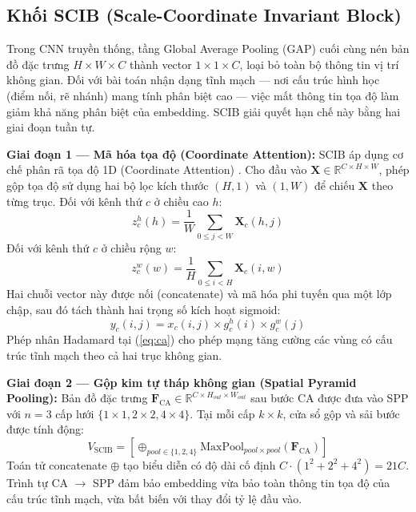 \documentclass[12pt,a4paper]{article}
\begin{document}
\subsection{Khối SCIB (Scale-Coordinate Invariant Block)}

Trong CNN truyền thống, tầng Global Average Pooling (GAP) cuối cùng nén bản đồ đặc trưng $H \times W \times C$ thành vector $1 \times 1 \times C$, loại bỏ toàn bộ thông tin vị trí không gian. Đối với bài toán nhận dạng tĩnh mạch --- nơi cấu trúc hình học (điểm nối, rẽ nhánh) mang tính phân biệt cao --- việc mất thông tin tọa độ làm giảm khả năng phân biệt của embedding. SCIB giải quyết hạn chế này bằng hai giai đoạn tuần tự.

\textbf{Giai đoạn 1 --- Mã hóa tọa độ (Coordinate Attention):} SCIB áp dụng cơ chế phân rã tọa độ 1D (Coordinate Attention) \cite{b7}. Cho đầu vào $\mathbf{X} \in \mathbb{R}^{C \times H \times W}$, phép gộp tọa độ sử dụng hai bộ lọc kích thước $(H, 1)$ và $(1, W)$ để chiếu $\mathbf{X}$ theo từng trục.
Đối với kênh thứ $c$ ở chiều cao $h$:
\begin{equation}
z_c^h(h) = \frac{1}{W}\sum_{0 \le j < W} \mathbf{X}_c(h, j)
\end{equation}
Đối với kênh thứ $c$ ở chiều rộng $w$:
\begin{equation}
z_c^w(w) = \frac{1}{H}\sum_{0 \le i < H} \mathbf{X}_c(i, w)
\end{equation}
Hai chuỗi vector này được nối (concatenate) và mã hóa phi tuyến qua một lớp chập, sau đó tách thành hai trọng số kích hoạt sigmoid:
\begin{equation}
y_c(i,j) = x_c(i,j) \times g_c^h(i) \times g_c^w(j)
\label{eq:ca}
\end{equation}
Phép nhân Hadamard tại (\ref{eq:ca}) cho phép mạng tăng cường các vùng có cấu trúc tĩnh mạch theo cả hai trục không gian.

\textbf{Giai đoạn 2 --- Gộp kim tự tháp không gian (Spatial Pyramid Pooling):} Bản đồ đặc trưng $\mathbf{F}_{\text{CA}} \in \mathbb{R}^{C \times H_{out} \times W_{out}}$ sau bước CA được đưa vào SPP \cite{b8} với $n=3$ cấp lưới $\{1\times1, 2\times2, 4\times4\}$. Tại mỗi cấp $k \times k$, cửa sổ gộp và sải bước được tính động:
\begin{equation}
V_{\text{SCIB}} = \left[ \mathop{\oplus}_{pool \in \{1,2,4\}} \text{MaxPool}_{pool\times pool} \left( \mathbf{F}_{\text{CA}} \right) \right]
\label{eq:spp}
\end{equation}
Toán tử concatenate $\oplus$ tạo biểu diễn có độ dài cố định $C \cdot (1^2 + 2^2 + 4^2) = 21C$. Trình tự CA $\rightarrow$ SPP đảm bảo embedding vừa bảo toàn thông tin tọa độ của cấu trúc tĩnh mạch, vừa bất biến với thay đổi tỷ lệ đầu vào.
\end{document}
